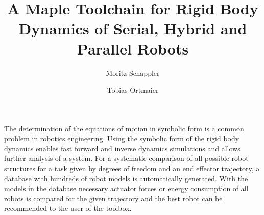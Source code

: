 \documentclass[runningheads]{llncs}
\begin{document}
%
\title{A Maple Toolchain for Rigid Body Dynamics of Serial, Hybrid and Parallel Robots}%
%
%
\author{Moritz Schappler \and Tobias Ortmaier}
%
%
%
\maketitle              %
%


The determination of the equations of motion in symbolic form is a common problem in robotics engineering.
Using the symbolic form of the rigid body dynamics enables fast forward and inverse dynamics simulations and allows further analysis of a system.
For a systematic comparison of all possible robot structures for a task given by degrees of freedom and an end effector trajectory, a database with hundreds of robot models is automatically generated.
With the models in the database necessary actuator forces or energy consumption of all robots is compared for the given trajectory and the best robot can be recommended to the user of the toolbox.
\end{document}
